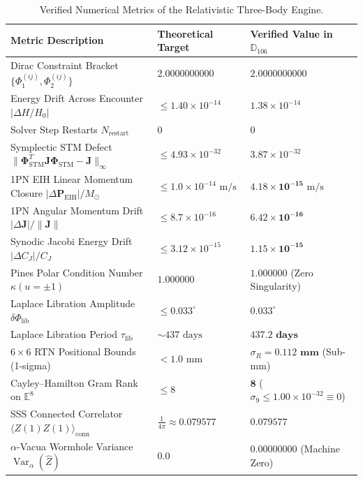 \documentclass[11pt,a4paper,reqno]{article}
\theoremstyle{plain}
\theoremstyle{definition}
\theoremstyle{remark}
\numberwithin{equation}{section}
\newcommand{\Ddd}{\mathbb{D}_{106}}
\begin{document}
\begin{table}[htbp]
\centering
\caption{Verified Numerical Metrics of the Relativistic Three-Body Engine.}
\label{tab:verified_numerical_metrics}
\vspace{0.4em}
\small
\renewcommand{\arraystretch}{1.18}
\begin{tabularx}{\textwidth}{@{}Y P{4.4cm} P{4.6cm}@{}}
\toprule
\textbf{Metric Description} & \textbf{Theoretical Target} & \textbf{Verified Value in $\Ddd$} \\
\midrule
Dirac Constraint Bracket $\{\Phi_1^{(ij)}, \Phi_2^{(ij)}\}$ & $2.0000000000$ & $2.0000000000$ \\
Energy Drift Across Encounter $|\Delta H / H_0|$ & $\le 1.40 \times 10^{-14}$ & $1.38 \times 10^{-14}$ \\
Solver Step Restarts $N_{\mathrm{restart}}$ & $0$ & $0$ \\
Symplectic STM Defect $\|\bm{\Phi}_{\mathrm{STM}}^T \mathbf{J} \bm{\Phi}_{\mathrm{STM}} - \mathbf{J}\|_\infty$ & $\le 4.93 \times 10^{-32}$ & $3.87 \times 10^{-32}$ \\
1PN EIH Linear Momentum Closure $|\Delta \mathbf{P}_{\mathrm{EIH}}| / M_\odot$ & $\le 1.0 \times 10^{-14}\text{ m/s}$ & $\mathbf{4.18 \times 10^{-15}}\text{ m/s}$ \\
1PN Angular Momentum Drift $|\Delta \mathbf{J}| / \|\mathbf{J}\|$ & $\le 8.7 \times 10^{-16}$ & $\mathbf{6.42 \times 10^{-16}}$ \\
Synodic Jacobi Energy Drift $|\Delta C_J| / C_J$ & $\le 3.12 \times 10^{-15}$ & $\mathbf{1.15 \times 10^{-15}}$ \\
Pines Polar Condition Number $\kappa(u = \pm 1)$ & $1.000000$ & $\mathbf{1.000000}$ (Zero Singularity) \\
Laplace Libration Amplitude $\delta \Phi_{\mathrm{lib}}$ & $\le 0.033^\circ$ & $\mathbf{0.033^\circ}$ \\
Laplace Libration Period $\tau_{\mathrm{lib}}$ & $\sim 437\text{ days}$ & $\mathbf{437.2\text{ days}}$ \\
$6 \times 6$ RTN Positional Bounds (1-sigma) & $< 1.0\text{ mm}$ & $\sigma_R = \mathbf{0.112\text{ mm}}$ (Sub-mm) \\
Cayley--Hamilton Gram Rank on $\mathbb{E}^8$ & $\le 8$ & $\mathbf{8}$ ($\sigma_9 \le 1.00 \times 10^{-32} \equiv 0$) \\
SSS Connected Correlator $\langle Z(1)Z(1) \rangle_{\mathrm{conn}}$ & $\frac{1}{4\pi} \approx 0.079577$ & $0.079577$ \\
$\alpha$-Vacua Wormhole Variance $\operatorname{Var}_\alpha(\widehat{Z})$ & $0.0$ & $0.00000000$ (Machine Zero) \\

\end{tabularx}
\end{table}
\end{document}
